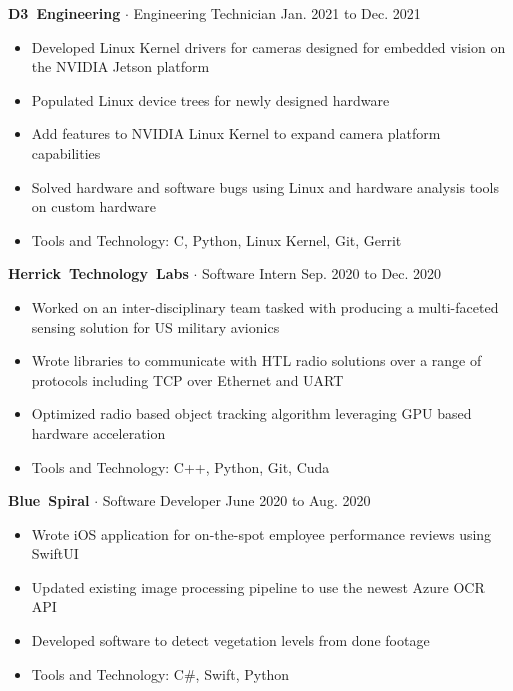 \documentclass{article}
\newcommand{\rSubSubSection}[1] {
  \textbf{{\fontsize{0.35cm}{0.45cm}\selectfont \hbox{#1}}}
}
\begin{document}
\rSubSubSection{D3 Engineering} $ \cdot $ Engineering Technician \hfill Jan. 2021 to Dec. 2021 \par
\vspace{-10pt}
\begin{itemize}
    \setlength\itemsep{0pt}
    \setlength{\parskip}{0pt}
    \item Developed Linux Kernel drivers for cameras designed for embedded vision on the NVIDIA Jetson platform
    \item Populated Linux device trees for newly designed hardware
    \item Add features to NVIDIA Linux Kernel to expand camera platform capabilities
    \item Solved hardware and software bugs using Linux and hardware analysis tools on custom hardware
    \item Tools and Technology: C, Python, Linux Kernel, Git, Gerrit
\end{itemize}
\vspace{-10pt}

\rSubSubSection{Herrick Technology Labs} $ \cdot $ Software Intern \hfill Sep. 2020 to Dec. 2020 \par
\vspace{-10pt}
\begin{itemize}
    \setlength\itemsep{0pt}
    \setlength{\parskip}{0pt}
    \item Worked on an inter-disciplinary team tasked with producing a multi-faceted sensing solution for US military avionics
    \item Wrote libraries to communicate with HTL radio solutions over a range of protocols including TCP over Ethernet and UART
    \item Optimized radio based object tracking algorithm leveraging GPU based hardware acceleration
    \item Tools and Technology: C++, Python, Git, Cuda
\end{itemize}
\vspace{-10pt}

\rSubSubSection{Blue Spiral} $ \cdot $ Software Developer \hfill June 2020 to Aug. 2020 \par
\vspace{-10pt}
\begin{itemize}
    \setlength\itemsep{0pt}
    \setlength{\parskip}{0pt}
    \item Wrote iOS application for on-the-spot employee performance reviews using SwiftUI
    \item Updated existing image processing pipeline to use the newest Azure OCR API
    \item Developed software to detect vegetation levels from done footage
    \item Tools and Technology: C\#, Swift, Python
\end{itemize}
\vspace{-10pt}
\end{document}
